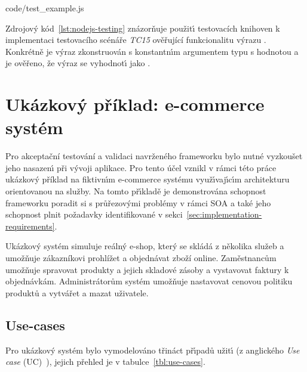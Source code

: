 
{code/test_example.js}

Zdrojov\'y kód~\ref{lst:nodejs-testing} znázorňuje použit\'{\i} testovacích knihoven k implementaci testovacího
scénáře \textit{TC15} ověřující funkcionalitu výrazu . Konkrétně je výraz zkonstruován s
konstantn\'{\i}m argumentem typu  s hodnotou  a je ověřeno, že v\'yraz se vyhodnot\'{\i}
jako .

\section{Ukázkový příklad: e-commerce systém}\label{sec:casestudy}

Pro akceptační testování a validaci navrženého frameworku bylo nutné vyzkoušet
jeho nasazen\'{\i} při v\'yvoji aplikace. Pro tento účel vznikl v rámci
této práce ukázkový příklad na fiktivn\'{\i}m e-commerce systému využ\'{\i}vaj\'{\i}c\'{\i}m
architekturu orientovanou na služby.
Na tomto př\'{\i}kladě je demonstrována schopnost frameworku poradit si s průřezov\'ymi
problémy v rámci \gls{SOA} a také jeho schopnost plnit požadavky identifikované v
sekci~\ref{sec:implementation-requirements}.

Ukázkový systém simuluje reálný e-shop, který se skládá z několika služeb a umožňuje
zákazníkovi prohlížet a objednávat zboží online. Zaměstnancům umožňuje spravovat produkty
a jejich skladové zásoby a vystavovat faktury k objednávkám. Administrátorům systém umožňuje
nastavovat cenovou politiku produktů a vytvářet a mazat uživatele.

\subsection{Use-cases}

Pro ukázkov\'y systém bylo vymodelováno třináct př\'{\i}padů užit\'{\i}
(z anglického \textit{Use case} (\gls{UC})~\cite{bittner2002use}), jejich
přehled je v tabulce~\ref{tbl:use-cases}.

